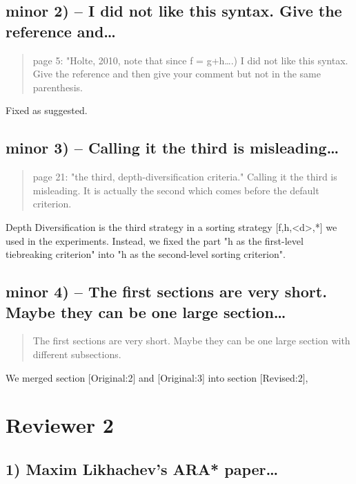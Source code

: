 \documentclass{article}
\begin{document}
\subsection{minor 2) -- I did not like this syntax. Give the reference and\ldots{}}
\label{sec:orgheadline10}

\begin{quote}
page 5: "Holte, 2010, note that since f = g+h\ldots{}.) I did not like this
syntax. Give the reference and then give your comment but not in the
same parenthesis.
\end{quote}

Fixed as suggested.

\subsection{minor 3) -- Calling it the  third is misleading\ldots{}}
\label{sec:orgheadline11}

\begin{quote}
page 21: "the third, depth-diversification criteria." Calling it the
third is misleading. It is actually the second which comes before the
default criterion.
\end{quote}

Depth Diversification is the third strategy
in a sorting strategy [f,h,<d>,*] we used in the experiments.
Instead, we fixed the part "h as the first-level tiebreaking criterion"
into "h as the second-level sorting criterion".

\subsection{minor 4) -- The first sections are very short. Maybe they can be one large section\ldots{}}
\label{sec:orgheadline12}

\begin{quote}
The first sections are very short. Maybe they can be one large section
with different subsections.
\end{quote}

We merged section [Original:2] and [Original:3] into section [Revised:2],

\section{Reviewer 2}
\label{sec:orgheadline25}

\subsection{1) Maxim Likhachev's ARA* paper\ldots{}}
\label{sec:orgheadline14}
\end{document}
